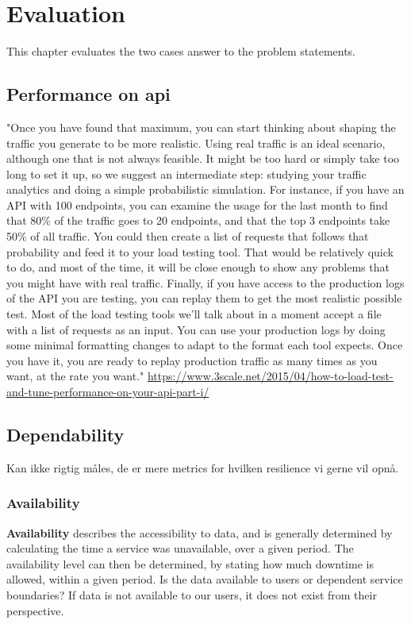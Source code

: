 \chapter{Evaluation}

This chapter evaluates the two cases answer to the problem statements.

\section{Performance on api}
"Once you have found that maximum, you can start thinking about shaping the traffic you generate to be more realistic. Using real traffic is an ideal scenario, although one that is not always feasible. It might be too hard or simply take too long to set it up, so we suggest an intermediate step: studying your traffic analytics and doing a simple probabilistic simulation. For instance, if you have an API with 100 endpoints, you can examine the usage for the last month to find that 80\% of the traffic goes to 20 endpoints, and that the top 3 endpoints take 50\% of all traffic. You could then create a list of requests that follows that probability and feed it to your load testing tool. That would be relatively quick to do, and most of the time, it will be close enough to show any problems that you might have with real traffic.
Finally, if you have access to the production logs of the API you are testing, you can replay them to get the most realistic possible test. Most of the load testing tools we’ll talk about in a moment accept a file with a list of requests as an input. You can use your production logs by doing some minimal formatting changes to adapt to the format each tool expects. Once you have it, you are ready to replay production traffic as many times as you want, at the rate you want."
\url{https://www.3scale.net/2015/04/how-to-load-test-and-tune-performance-on-your-api-part-i/}


\section{Dependability}

Kan ikke rigtig måles, de er mere metrics for hvilken resilience vi gerne vil opnå.

\subsection{Availability}
\textbf{Availability} describes the accessibility to data, and is generally determined by calculating the time a service was unavailable, over a given period. The availability level can then be determined, by stating how much downtime is allowed, within a given period\cite[p. 477]{beyer2016siteReliabilityEngineering}. Is the data available to users or dependent service boundaries? If data is not available to our users, it does not exist from their perspective\cite[p. 345]{beyer2016siteReliabilityEngineering}.

